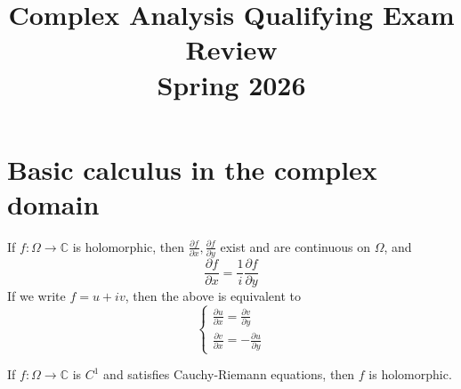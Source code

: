 \documentclass[openany]{book}
\title{Complex Analysis Qualifying Exam Review
\\ 
\vspace{0.4cm}
\large Spring 2026}
\newcommand{\C}{\mathbb{C}}
\begin{document}
\maketitle

\tableofcontents
\newpage



\chapter{Basic calculus in the complex domain}

\begin{prop}
    If $f:\Omega\to\C$ is holomorphic, then $\frac{\partial f}{\partial x}, \frac{\partial f}{\partial y}$ exist and are continuous on $\Omega$, and 
    \begin{equation*}
        \frac{\partial f}{\partial x}=\frac{1}{i}\frac{\partial f}{\partial y}
    \end{equation*}
    If we write $f=u+iv$, then the above is equivalent to 
    \begin{equation*}
        \begin{cases}
            \frac{\partial u}{\partial x}=\frac{\partial v}{\partial y}\\
            \frac{\partial v}{\partial x}=-\frac{\partial u}{\partial y}
        \end{cases}
    \end{equation*}
\end{prop}

\begin{prop}
    If $f:\Omega\to\C$ is $C^1$ and satisfies Cauchy-Riemann equations, then $f$ is holomorphic.
\end{prop}

\end{document}
